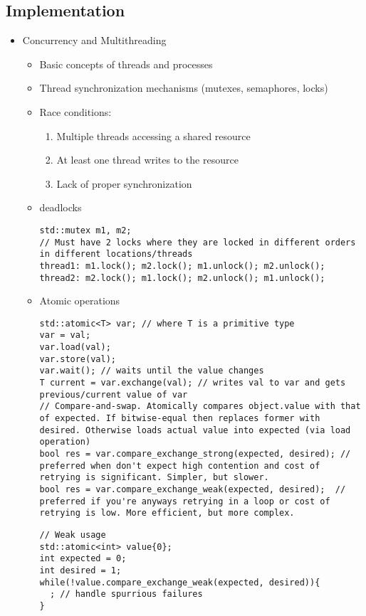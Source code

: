\documentclass{article}
\begin{document}
    \subsection{Implementation}
      \begin{itemize}
        \item Concurrency and Multithreading
          \begin{itemize}
            \item Basic concepts of threads and processes
            \item Thread synchronization mechanisms (mutexes, semaphores, locks)
            \item Race conditions:
              \begin{enumerate}
                \item Multiple threads accessing a shared resource
                \item At least one thread writes to the resource
                \item Lack of proper synchronization
              \end{enumerate}
            \item deadlocks
              \begin{lstlisting}[style=cpp]
std::mutex m1, m2;
// Must have 2 locks where they are locked in different orders in different locations/threads
thread1: m1.lock(); m2.lock(); m1.unlock(); m2.unlock();
thread2: m2.lock(); m1.lock(); m2.unlock(); m1.unlock();
              \end{lstlisting}
            \item Atomic operations \\
              \begin{lstlisting}[style=cpp]
std::atomic<T> var; // where T is a primitive type
var = val;
var.load(val);
var.store(val);
var.wait(); // waits until the value changes
T current = var.exchange(val); // writes val to var and gets previous/current value of var
// Compare-and-swap. Atomically compares object.value with that of expected. If bitwise-equal then replaces former with desired. Otherwise loads actual value into expected (via load operation)
bool res = var.compare_exchange_strong(expected, desired); // preferred when don't expect high contention and cost of retrying is significant. Simpler, but slower.
bool res = var.compare_exchange_weak(expected, desired);  // preferred if you're anyways retrying in a loop or cost of retrying is low. More efficient, but more complex.
              \end{lstlisting}
              \begin{lstlisting}[style=cpp]
// Weak usage
std::atomic<int> value{0};
int expected = 0;
int desired = 1;
while(!value.compare_exchange_weak(expected, desired)){
  ; // handle spurrious failures
}


\end{lstlisting}
\end{itemize}
\end{itemize}
\end{document}
